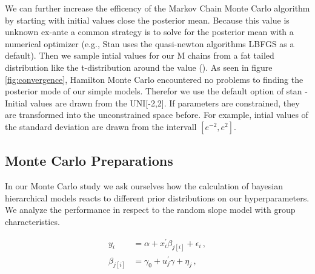 
We can further increase the efficency of the Markov Chain Monte Carlo algorithm by starting with initial values close the posterior mean. Because this value is unknown ex-ante a common strategy is to solve for the posterior mean with a numerical optimizer (e.g., Stan uses the quasi-newton algorithms LBFGS as a default). Then we sample intial values for our M chains from a fat tailed distribution like the t-distribution around the value (\cite{brooks1998}).
As seen in figure \ref{fig:convergence}, Hamilton Monte Carlo encountered no problems to finding the posterior mode of our simple models. Therefor we use the default option of stan - Initial values are drawn from the UNI[-2,2]. If parameters are constrained, they are transformed into the unconstrained space before. For example, intial values of the standard deviation are drawn from the intervall $[e^{-2},e^2]$.   




\subsection{Monte Carlo Preparations}
In our Monte Carlo study we ask ourselves how the calculation of bayesian hierarchical models reacts to different prior distributions on our hyperparameters.
We analyze the performance in respect to the random slope model with group characteristics.

\begin{align}
  y_i &= \alpha+ x_i^\prime \beta_{j[i]} + \epsilon_i \,,\\
  \beta_{j[i]} &= \gamma_0 + u_j^\prime \gamma + \eta_j \,,
\end{align}

